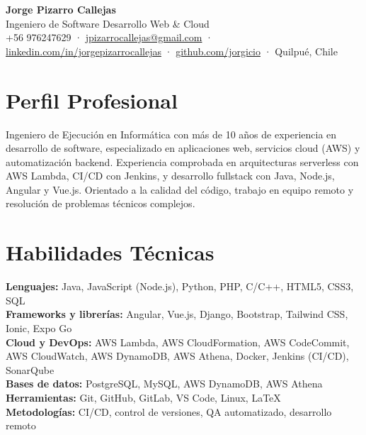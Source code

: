 \documentclass[a4paper,11pt]{article}
\newcommand{\habilidad}[2]{%
  \textbf{#1:} #2 \\[2pt]
}
\begin{document}

\begin{center}
  {\Huge\bfseries\color{azulcv} Jorge Pizarro Callejas} \\[6pt]
  {\large\color{gris} Ingeniero de Software \textbar{} Desarrollo Web \& Cloud} \\[6pt]
  {\small\color{gris}
    +56 976247629 \;·\;
    \href{mailto:jpizarrocallejas@gmail.com}{jpizarrocallejas@gmail.com} \;·\;
    \href{https://linkedin.com/in/jorgepizarrocallejas}{linkedin.com/in/jorgepizarrocallejas} \;·\;
    \href{https://github.com/jorgicio}{github.com/jorgicio} \;·\;
    Quilpué, Chile
  }
\end{center}

\vspace{4pt}

\section{Perfil Profesional}

Ingeniero de Ejecución en Informática con más de 10 años de experiencia en desarrollo de
software, especializado en aplicaciones web, servicios cloud (AWS) y automatización backend.
Experiencia comprobada en arquitecturas serverless con AWS Lambda, CI/CD con Jenkins, y
desarrollo fullstack con Java, Node.js, Angular y Vue.js. Orientado a la calidad del código,
trabajo en equipo remoto y resolución de problemas técnicos complejos.

\section{Habilidades Técnicas}

\habilidad{Lenguajes}{Java, JavaScript (Node.js), Python, PHP, C/C++, HTML5, CSS3, SQL}
\habilidad{Frameworks y librerías}{Angular, Vue.js, Django, Bootstrap, Tailwind CSS, Ionic, Expo Go}
\habilidad{Cloud y DevOps}{AWS Lambda, AWS CloudFormation, AWS CodeCommit, AWS CloudWatch, AWS DynamoDB, AWS Athena, Docker, Jenkins (CI/CD), SonarQube}
\habilidad{Bases de datos}{PostgreSQL, MySQL, AWS DynamoDB, AWS Athena}
\habilidad{Herramientas}{Git, GitHub, GitLab, VS Code, Linux, \LaTeX}
\habilidad{Metodologías}{CI/CD, control de versiones, QA automatizado, desarrollo remoto}
\end{document}
